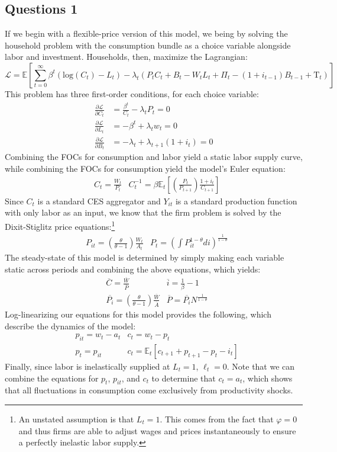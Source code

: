 \documentclass{article}
\newcommand{\loge}[1]{\text{log}\left(#1\right)}
\renewcommand{\L}{\mathcal{L}}
\newcommand{\suminf}{\sum_{t=0}^\infty}
\newcommand{\Tau}{\mathrm{T}}
\newcommand{\E}[1]{\mathbb{E}\left[#1\right]} %
\newcommand{\Et}[1]{\mathbb{E}_t\left[#1\right]}
\begin{document}
\subsection*{Questions 1}
If we begin with a flexible-price version of this model, we being by solving the household problem with the consumption bundle as a choice variable  alongside labor and investment. Households, then, maximize the Lagrangian:
\[
	\L = \E{\suminf\beta^t\left(\loge{C_t}-L_t\right)-\lambda_t\left(P_tC_t + B_t - W_tL_t + \Pi_t - (1+i_{t-1})B_{t-1} + \Tau_t\right)}
\]
This problem has three first-order conditions, for each choice variable:
\begin{align*}
	\frac{\partial\L}{\partial C_t}	&= \frac{\beta^t}{C_t} - \lambda_tP_t	= 0 	\\
	\frac{\partial\L}{\partial L_t}	&= -\beta^t + \lambda_tw_t				= 0		\\
	\frac{\partial\L}{\partial B_t}	&= -\lambda_t + \lambda_{t+1}(1+i_t)	= 0
\end{align*}
Combining the FOCs for consumption and labor yield a static labor supply curve, while combining the FOCs for consumption yield the model's Euler equation:
\begin{align*}
	&C_t 		= \frac{W_t}{P_t}													
	&C_t^{-1} 	= \beta\Et{\left(\frac{P_t}{P_{t+1}}\right)\frac{1+i_t}{C_{t+1}}}
\end{align*}
Since $C_t$ is a standard CES aggregator and $Y_{it}$ is a standard production function with only labor as an input, we know that the firm problem is solved by the Dixit-Stiglitz price equations:\footnote{An unstated assumption is that ${L_t=1}$. This comes from the fact that ${\varphi=0}$ and thus firms are able to adjust wages and prices instantaneously to ensure a perfectly inelastic labor supply.}
\begin{align*}
	&P_{it} = \left(\frac{\theta}{\theta-1}\right)\frac{W_t}{A_t} 
	&P_t 	= \left(\int P_{it}^{1-\theta}di\right)^{\frac{1}{1-\theta}}
\end{align*}
The steady-state of this model is determined by simply making each variable static across periods and combining the above equations, which yields:
\begin{align*}
	&\overline{C} 	= \frac{\overline{W}}{\overline{P}}															
	&\overline{i}	= \frac{1}{\beta} - 1													\\
	&\overline{P_i}	= \left(\frac{\theta}{\theta-1}\right)\frac{\overline{W}}{\overline{A}}						
	&\overline{P}	= \overline{P_i}N^{\frac{1}{1-\theta}}
\end{align*}
Log-linearizing our equations for this model provides the following, which describe the dynamics of the model:
\begin{align*}
	&p_{it} = w_t-a_t 
	&c_t	= w_t - p_t	\\
	&p_t 	= p_{it}	
	&c_t 	= \Et{c_{t+1} + p_{t+1} - p_t - i_t}
\end{align*}
Finally, since labor is inelastically supplied at ${L_t=1}$, ${\ell_t=0}$. Note that we can combine the equations for $p_t$, $p_{it}$, and $c_t$ to determine that ${c_t=a_t}$, which shows that all fluctuations in consumption come exclusively from productivity shocks.
\end{document}

